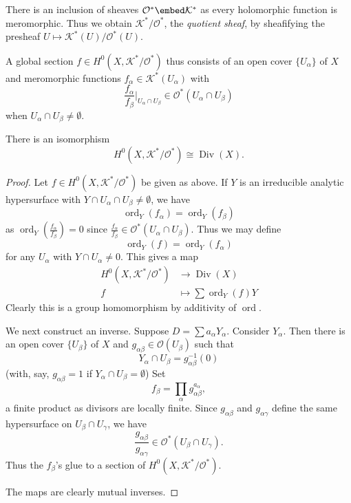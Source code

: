 \documentclass[a4paper]{article}
\DeclareMathOperator{\ord}{ord} %
\DeclareMathOperator{\Div}{Div} %
\begin{document}
There is an inclusion of sheaves \(\mathcal O^* \embed \mathcal K^*\) as every holomorphic function is meromorphic. Thus we obtain \(\mathcal K^*/\mathcal O^*\), the \emph{quotient sheaf}, by sheafifying the presheaf \(U \mapsto \mathcal K^*(U)/\mathcal O^*(U)\).

A global section \(f \in H^0(X, \mathcal K^*/\mathcal O^*)\) thus consists of an open cover \(\{U_\alpha\}\) of \(X\) and meromorphic functions \(f_\alpha \in \mathcal K^*(U_\alpha)\) with
\[
  \frac{f_\alpha}{f_\beta} \Big|_{U_\alpha \cap U_\beta} \in \mathcal O^*(U_\alpha \cap U_\beta)
\]
when \(U_\alpha \cap U_\beta \neq \emptyset\).

\begin{proposition}
  There is an isomorphism
  \[
    H^0(X, \mathcal K^*/\mathcal O^*) \cong \Div(X).
  \]
\end{proposition}

\begin{proof}
  Let \(f \in H^0(X, \mathcal K^*/\mathcal O^*)\) be given as above. If \(Y\) is an irreducible analytic hypersurface with \(Y \cap U_\alpha \cap U_\beta \neq \emptyset\), we have
  \[
    \ord_Y(f_\alpha) = \ord_Y(f_\beta)
  \]
  as \(\ord_Y(\frac{f_\alpha}{f_\beta}) = 0\) since \(\frac{f_\alpha}{f_\beta} \in \mathcal O^*(U_\alpha \cap U_\beta)\). Thus we may define
  \[
    \ord_Y(f) = \ord_Y(f_\alpha)
  \]
  for any \(U_\alpha\) with \(Y \cap U_\alpha \neq 0\). This gives a map
  \begin{align*}
    H^0(X, \mathcal K^*/\mathcal O^*) &\to \Div(X) \\
    f &\mapsto \sum \ord_Y(f) Y
  \end{align*}
  Clearly this is a group homomorphism by additivity of \(\ord\).

  We next construct an inverse. Suppose \(D = \sum a_\alpha Y_\alpha\). Consider \(Y_\alpha\). Then there is an open cover \(\{U_\beta\}\) of \(X\) and \(g_{\alpha\beta} \in \mathcal O(U_\beta)\) such that
  \[
    Y_\alpha \cap U_\beta = g_{\alpha\beta}^{-1}(0)
  \]
  (with, say, \(g_{\alpha\beta} = 1\) if \(Y_\alpha \cap U_\beta = \emptyset\)) Set
  \[
    f_\beta = \prod_\alpha g_{\alpha\beta}^{a_\alpha},
  \]
  a finite product as divisors are locally finite. Since \(g_{\alpha\beta}\) and \(g_{\alpha\gamma}\) define the same hypersurface on \(U_\beta \cap U_\gamma\), we have
  \[
    \frac{g_{\alpha\beta}}{g_{\alpha\gamma}} \in \mathcal O^*(U_\beta \cap U_\gamma).
  \]
  Thus the \(f_\beta\)'s glue to a section of \(H^0(X, \mathcal K^*/\mathcal O^*)\).

  The maps are clearly mutual inverses.
\end{proof}
\end{document}
